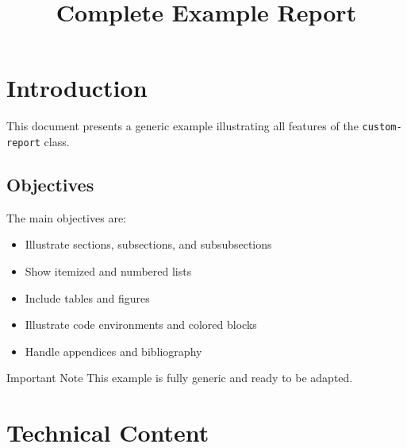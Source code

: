 \documentclass[11pt]{custom-report}
\title{Complete Example Report}
\begin{document}
\subject{Example Subject}

\setmargins
\makecoverpage

\clearemptydoublepage
\renewcommand{\contentsname}{Table of Contents}
\tableofcontents
\newpage
\listoffigures
\newpage
\listoftables

\clearemptydoublepage
\section{Introduction}

This document presents a generic example illustrating all features of the \texttt{custom-report} class.

\subsection{Objectives}
The main objectives are:

\begin{itemize}
    \item Illustrate sections, subsections, and subsubsections
    \item Show itemized and numbered lists
    \item Include tables and figures
    \item Illustrate code environments and colored blocks
    \item Handle appendices and bibliography
\end{itemize}

\begin{alertblock}{Important Note}
This example is fully generic and ready to be adapted.
\end{alertblock}

\section{Technical Content}
\end{document}
